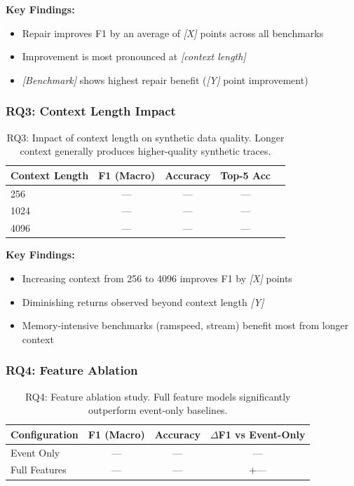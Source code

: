 \textbf{Key Findings:}
\begin{itemize}
    \item Repair improves F1 by an average of \textit{[X]} points across all benchmarks
    \item Improvement is most pronounced at \textit{[context length]}
    \item \textit{[Benchmark]} shows highest repair benefit (\textit{[Y]} point improvement)
\end{itemize}

\subsubsection{RQ3: Context Length Impact}

\begin{table}[h]
\centering
\caption{RQ3: Impact of context length on synthetic data quality. Longer context generally produces higher-quality synthetic traces.}
\label{tab:rq3_results}
\begin{tabular}{@{}lcccc@{}}
\toprule
\textbf{Context Length} & \textbf{F1 (Macro)} & \textbf{Accuracy} & \textbf{Top-5 Acc} \\
\midrule
256         & --- & --- & --- \\
1024        & --- & --- & --- \\
4096        & --- & --- & --- \\
\bottomrule
\end{tabular}
\end{table}

\textbf{Key Findings:}
\begin{itemize}
    \item Increasing context from 256 to 4096 improves F1 by \textit{[X]} points
    \item Diminishing returns observed beyond context length \textit{[Y]}
    \item Memory-intensive benchmarks (ramspeed, stream) benefit most from longer context
\end{itemize}

\subsubsection{RQ4: Feature Ablation}

\begin{table}[h]
\centering
\caption{RQ4: Feature ablation study. Full feature models significantly outperform event-only baselines.}
\label{tab:rq4_results}
\begin{tabular}{@{}lccc@{}}
\toprule
\textbf{Configuration} & \textbf{F1 (Macro)} & \textbf{Accuracy} & \textbf{\(\Delta\)F1 vs Event-Only} \\
\midrule
Event Only              & --- & --- & --- \\
Full Features           & --- & --- & +--- \\
\bottomrule
\end{tabular}
\end{table}

